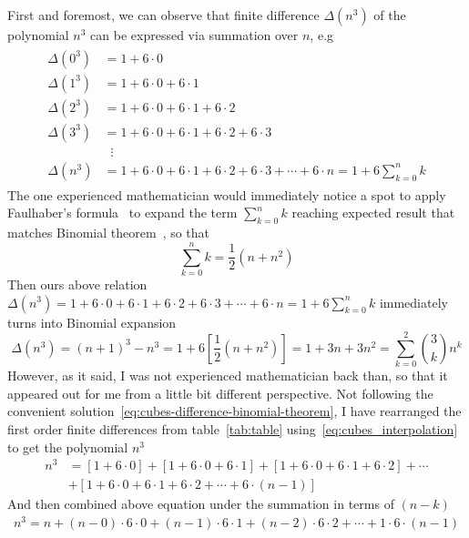 First and foremost, we can observe that finite difference $\Delta(n^3)$ of the polynomial $n^3$
can be expressed via summation over $n$, e.g
\begin{align}
    \label{eq:cubes_interpolation}
    \begin{split}
        \Delta(0^3) &= 1+6 \cdot 0 \\
        \Delta(1^3) &= 1+6\cdot0+6\cdot1 \\
        \Delta(2^3) &= 1+6\cdot0+6\cdot1+6\cdot2 \\
        \Delta(3^3) &= 1+6\cdot0+6\cdot1+6\cdot2+6\cdot3 \\
        &\; \; \vdots \\
        \Delta(n^3) &= 1+6\cdot0+6\cdot1+6\cdot2+6\cdot3+\cdots+6\cdot n = 1 + 6 \sum_{k=0}^{n} k
    \end{split}
\end{align}
The one experienced mathematician would immediately notice a spot to apply Faulhaber's formula~\cite{beardon1996sums}
to expand the term $\sum_{k=0}^{n} k$ reaching expected result that matches Binomial theorem~\cite{abramowitz1988handbook},
so that
\begin{equation*}
    \sum_{k=0}^{n} k = \frac{1}{2}(n+n^2)
\end{equation*}
Then ours above relation $\Delta(n^3) = 1+6\cdot0+6\cdot1+6\cdot2+6\cdot3+\cdots+6\cdot n = 1 + 6 \sum_{k=0}^{n} k$
immediately turns into Binomial expansion
\begin{equation}
    \Delta(n^3) = (n+1)^3 - n^3 = 1 + 6 \left[ \frac{1}{2}(n+n^2) \right] = 1 + 3 n + 3 n^2 = \sum_{k=0}^{2} \binom{3}{k} n^k
    \label{eq:cubes-difference-binomial-theorem}
\end{equation}
However, as it said, I was not experienced mathematician back than,
so that it appeared out for me from a little bit different perspective.
Not following the convenient solution~\eqref{eq:cubes-difference-binomial-theorem},
I have rearranged the first order finite differences from table~\eqref{tab:table} using~\eqref{eq:cubes_interpolation}
to get the polynomial $n^3$
\begin{align*}
    n^3 &= [1+6\cdot0]+[1+6\cdot0+6\cdot1]+[1+6\cdot0+6\cdot1+6\cdot2]+\cdots \\
    &+[1+6\cdot0+6\cdot1+6\cdot2+\cdots+6\cdot(n-1)]
\end{align*}
And then combined above equation under the summation in terms of $(n-k)$
\begin{equation*}
    \begin{split}
        n^3 = n +(n-0) \cdot6 \cdot0 + (n-1)\cdot6\cdot1 + (n-2)\cdot6\cdot2 + \cdots + 1\cdot6\cdot(n-1)
    \end{split}
\end{equation*}
